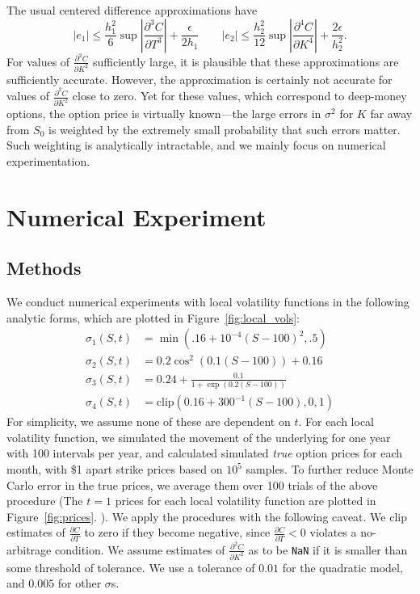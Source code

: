 \documentclass[11pt]{article}
\numberwithin{equation}{section}
\newcommand{\diff}[2]{\frac{\partial #1}{\partial #2}}
\newcommand{\abs}[1]{\left|#1\right|}
\begin{document}
The usual centered difference approximations have
\[
|e_1|\le \frac{h_1^2}{6}\sup \abs{\diff{^3C}{T^3}} + \frac{\epsilon}{2h_1}
\qquad |e_2| \le \frac{h_2^2}{12}\sup \abs{\diff{^4C}{K^4}} +
\frac{2\epsilon}{h_2^2}.
\]
For values of $\diff{^2C}{K^2}$ sufficiently large, it is plausible that these
approximations are sufficiently accurate. However, the approximation is
certainly not accurate for values of $\diff{^2C}{K^2}$ close to zero. Yet for
these values, which correspond to deep-money options, the option price is
virtually known---the large errors in $\sigma^2$ for $K$ far away from $S_0$ is
weighted by the extremely small probability that such errors matter. Such
weighting is analytically intractable, and we mainly focus on numerical
experimentation. 
 


 
\section{Numerical Experiment}
\label{sec:numericalexp}

\subsection{Methods}
We conduct numerical experiments with local volatility functions in the following analytic forms, which are plotted in Figure~\ref{fig:local_vols}: \begin{align*}
\sigma_1(S,t) &= \min(.16 + 10^{-4}(S-100)^2, .5) \tag{Quadratic}\\
\sigma_2(S,t) &= 0.2\cos^2(0.1(S-100)) + 0.16 \tag{Sinusoidal}\\
\sigma_3(S,t) &= 0.24 + \frac{0.1}{1+\exp(0.2(S-100))} \tag{Logistic} \\
\sigma_4(S,t) &= \text{clip}(0.16 + 300^{-1}(S - 100),0,1) \tag{Linear}
\end{align*}
For simplicity, we assume none of these are dependent on $t$. For each local volatility function, we simulated the movement of the underlying for one year with 100 intervals per year, and calculated simulated \emph{true} option prices for each month, with \$1 apart strike prices based on $10^5$ samples. To further reduce Monte Carlo error in the true prices, we average them over 100 trials of the above procedure (The $t=1$ prices for each local volatility function are plotted in Figure~\ref{fig:prices}.
). We apply the procedures with the following caveat. We clip estimates of $\diff{C}{T}$ to zero if they become negative, since $\diff{C}{T} < 0$ violates a no-arbitrage condition. We assume estimates of $\diff{^2C}{K^2}$ as to be \texttt{NaN} if it is smaller than some threshold of tolerance. We use a tolerance of $0.01$ for the quadratic model, and $0.005$ for other $\sigma$s. 
 
\end{document}
